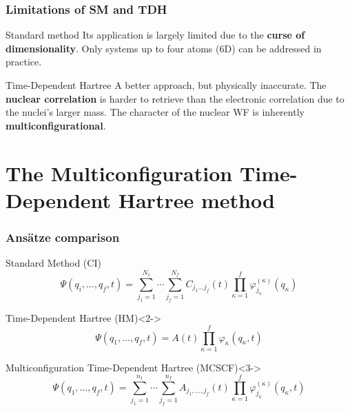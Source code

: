 \documentclass{beamer}
\begin{document}
\begin{frame}
  \frametitle{Limitations of SM and TDH}
  \begin{exampleblock}{Standard method}
    \justifying{}
    Its application is largely limited due to the \textbf{curse of dimensionality}. Only systems up to four atoms (6D) can be addressed in practice.
  \end{exampleblock}
  \begin{block}{Time-Dependent Hartree}
    A better approach, but physically inaccurate. The \textbf{nuclear correlation} is harder to retrieve
    than the electronic correlation due to the nuclei's larger mass. The character of the nuclear WF is inherently \textbf{multiconfigurational}. 
  \end{block}
\end{frame}

\section{The Multiconfiguration Time-Dependent Hartree method}\label{mctdh}

\begin{frame}
  \frametitle{Ansätze comparison}
  \vspace{-.3cm}
  \begin{block}{Standard Method (CI)}
    \begin{equation}
      \Psi(q_i,\ldots, q_f, t) = \sum_{j_1=1}^{N_1}\cdots\sum_{j_f=1}^{N_f} C_{j_1\ldots j_f}(t)\prod_{\kappa=1}^f\varphi^{(\kappa)}_{j_{\kappa}}(q_{\kappa})
    \end{equation}
  \end{block}
  \begin{exampleblock}{Time-Dependent Hartree (HM)}<2->
    \begin{equation}
      \Psi(q_1,\ldots, q_f, t) = A(t)\prod^f_{\kappa=1}\varphi_{\kappa}(q_{\kappa}, t)
    \end{equation}
  \end{exampleblock}

  \begin{alertblock}{Multiconfiguration Time-Dependent Hartree (MCSCF)}<3->
    \begin{equation}
      \Psi(q_1,\ldots, q_f, t) = \sum^{n_1}_{j_1=1}\cdots\sum^{n_f}_{j_f=1}A_{j_1,\ldots,j_f}(t)\prod^{f}_{\kappa=1}\varphi^{(\kappa)}_{j_{\kappa}}(q_{\kappa}, t)
      \label{mctdh_antz}
    \end{equation}
  \end{alertblock}
\end{frame}
\end{document}
